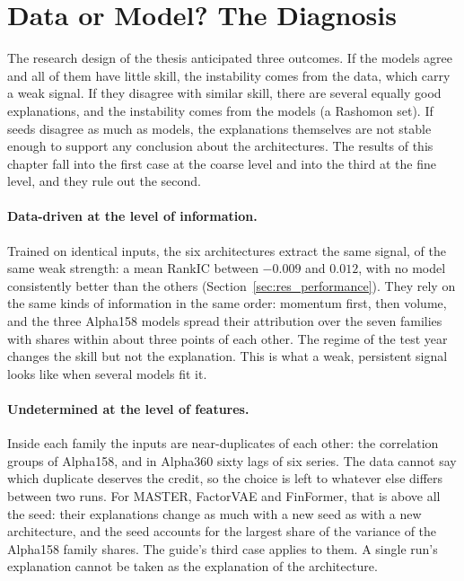 \section{Data or Model? The Diagnosis}
\label{sec:res_diagnosis}

The research design of the thesis anticipated three outcomes. If the models agree and all of them have little skill, the instability comes from the data, which carry a weak signal. If they disagree with similar skill, there are several equally good explanations, and the instability comes from the models (a Rashomon set). If seeds disagree as much as models, the explanations themselves are not stable enough to support any conclusion about the architectures. The results of this chapter fall into the first case at the coarse level and into the third at the fine level, and they rule out the second.

\paragraph{Data-driven at the level of information.} Trained on identical inputs, the six architectures extract the same signal, of the same weak strength: a mean RankIC between $-0.009$ and $0.012$, with no model consistently better than the others (Section~\ref{sec:res_performance}). They rely on the same kinds of information in the same order: momentum first, then volume, and the three Alpha158 models spread their attribution over the seven families with shares within about three points of each other. The regime of the test year changes the skill but not the explanation. This is what a weak, persistent signal looks like when several models fit it.

\paragraph{Undetermined at the level of features.} Inside each family the inputs are near-duplicates of each other: the correlation groups of Alpha158, and in Alpha360 sixty lags of six series. The data cannot say which duplicate deserves the credit, so the choice is left to whatever else differs between two runs. For MASTER, FactorVAE and FinFormer, that is above all the seed: their explanations change as much with a new seed as with a new architecture, and the seed accounts for the largest share of the variance of the Alpha158 family shares. The guide's third case applies to them. A single run's explanation cannot be taken as the explanation of the architecture.

